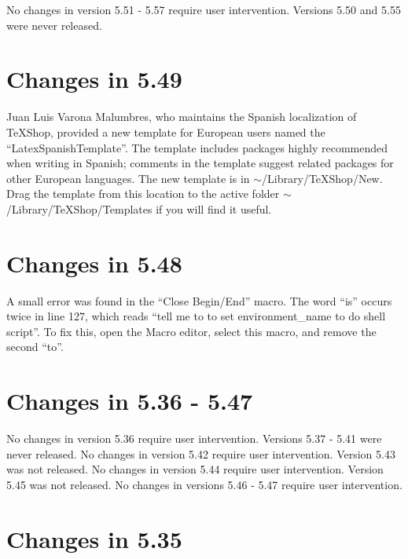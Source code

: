 \documentclass[11pt, oneside]{amsart}
\begin{document}
No changes in version 5.51 - 5.57 require user intervention. Versions 5.50 and 5.55 were never released.  

\section{Changes in 5.49}

Juan Luis Varona Malumbres, who maintains the Spanish localization of TeXShop, provided a new template for European users named the ``LatexSpanishTemplate''. The template includes packages highly recommended when writing in Spanish; comments in the template suggest related packages for other European languages. The new template is in $\sim$/Library/TeXShop/New. Drag the template from this location to the active folder $\sim$/Library/TeXShop/Templates if you will find it useful.



\section{Changes in 5.48}

A small error was found in the ``Close Begin/End'' macro. The word ``is'' occurs twice in line 127,
which reads ``tell me to to set environment\_name to do shell script''. To fix this, open the Macro editor,
select this macro, and remove the second ``to''. 

\section{Changes in 5.36 - 5.47}

No changes in version 5.36 require user intervention. Versions 5.37 - 5.41 were never released. No changes in version 5.42 require user intervention. Version 5.43 was not released. No changes in version 5.44 require user intervention.
Version 5.45 was not released. No changes in versions 5.46 - 5.47 require user intervention.

\section{Changes in 5.35}
\end{document}
